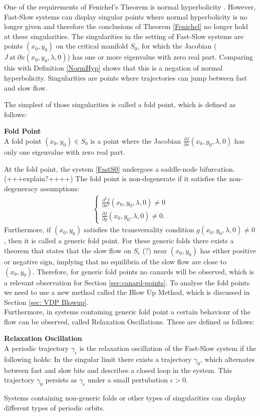 
One of the requirements of Fenichel's Theorem is normal hyperbolicity \citep{Kuehn}. However, Fast-Slow systems can display singular points where normal hyperbolicity is no longer given and therefore the conclusions of Theorem \ref{Fenichel} no longer hold at these singularities.
The singularities in the setting of Fast-Slow systems are points $(x_0,y_0)$ on the critical manifold $S_0$, for which the Jacobian ($ J \ \text{at} \ {\partial x}(x_0,y_0, \lambda, 0)$) has one or more eigenvalue with zero real part. Comparing this with Definition \ref{NormHyp} shows that this is a negation of normal hyperbolicity. Singularities are points where trajectories can jump between fast and slow flow. 

The simplest of those singularities is called a fold point, which is defined as follows:
\begin{definition}{\textbf{Fold Point}} \label{FoldDef} \\
A fold point $(x_0,y_0) \in S_0$ is a point where the Jacobian $ \frac{\partial f}{\partial x}(x_0,y_0, \lambda, 0)$ has only one eigenvalue with zero real part.
\end{definition}
At the fold point, the system \ref{FastS0} undergoes a saddle-node bifurcation. (+++explain?++++)
The fold point is non-degenerate if it satisfies the non-degeneracy assumptions:
\begin{align} \label{NonDeg}
\begin{cases}
\frac{ \partial ^2 f}{ \partial x^2} (x_0,y_0, \lambda, 0) \neq 0 \\
\frac{\partial f}{\partial y}(x_0,y_0, \lambda, 0) \neq 0.
\end{cases}
\end{align}
Furthermore, if $(x_0,y_0)$ satisfies the transversality condition $g(x_0,y_0, \lambda, 0) \neq 0$, then it is called a generic fold point.
For these generic folds there exists a theorem that states that the slow flow on $S_\epsilon$ (?) near $(x_0,y_0)$ has either positive or negative sign, implying that no equilibria of the slow flow are close to $(x_0,y_0)$. Therefore, for generic fold points no canards will be observed, which is a relevant observation for Section \ref{sec:canard-points}. To analyse the fold points we need to use a new method called the Blow Up Method, which is discussed in Section \ref{sec: VDP Blowup}.\\

Furthermore, in systems containing generic fold point a certain behaviour of the flow can be observed, called Relaxation Oscillations. These are defined as follows:
\begin{definition}{\textbf{Relaxation Oscillation}}\\
A periodic trajectory $\gamma_\epsilon$ is the relaxation oscillation of the Fast-Slow system if the following holds:
In the singular limit there exists a trajectory $\gamma_0$, which alternates between fast and slow bits and describes a closed loop in the system. This trajectory $\gamma_0$ persists as $\gamma_\epsilon$ under a small pertubation $\epsilon >0$.
\end{definition} 
Systems containing non-generic folds or other types of singularities can display different types of periodic orbits.
